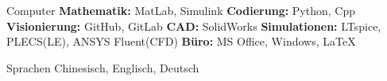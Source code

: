 

\begin{cvskills}

  \cvskill
    {Computer} %
    {\textbf{Mathematik:} MatLab, Simulink \textbf{Codierung:} Python, Cpp \textbf{Visionierung: } GitHub, GitLab \textbf{CAD:} SolidWorks \textbf{Simulationen:} LTspice, PLECS(LE), ANSYS Fluent(CFD) \textbf{Büro:} MS Office, Windows, \LaTeX} %
    
  \cvskill
    {Sprachen} %
    {Chinesisch, Englisch, Deutsch} %
    
\end{cvskills}
